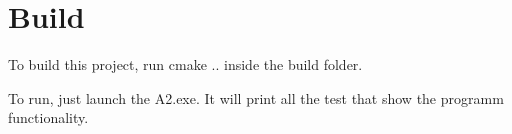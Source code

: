 \chapter{Build}
\hypertarget{md__r_e_a_d_m_e}{}\label{md__r_e_a_d_m_e}
\label{md__r_e_a_d_m_e_autotoc_md0}%
%
 To build this project, run {\ttfamily cmake ..} inside the build folder.

To run, just launch the A2.\+exe. It will print all the test that show the programm functionality. 